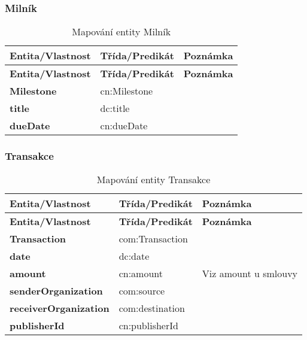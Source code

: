 \subsubsection*{Milník}

\begin{center}
\begin{longtable}{lp{30mm}p{65mm}}
\label{grid_mlmmh} \\
\multicolumn{1}{l}{\textbf{Entita/Vlastnost}} & 
\multicolumn{1}{l}{\textbf{Třída/Predikát}} & 
\multicolumn{1}{l}{\textbf{Poznámka}} \\ \hline 
\endfirsthead
\multicolumn{1}{l}{\textbf{Entita/Vlastnost}} & 
\multicolumn{1}{l}{\textbf{Třída/Predikát}} & 
\multicolumn{1}{l}{\textbf{Poznámka}} \\ \hline 
\hline
\endhead
\endfoot
\caption{Mapování entity Milník}
\endlastfoot
\textbf{Milestone} & cn:Milestone \\
\textbf{title} & dc:title \\
\textbf{dueDate} & cn:dueDate \\
\end{longtable}
\end{center}

\newpage

\subsubsection*{Transakce}

\begin{center}
\begin{longtable}{lp{30mm}p{65mm}}
\label{grid_mlmmh} \\
\multicolumn{1}{l}{\textbf{Entita/Vlastnost}} & 
\multicolumn{1}{l}{\textbf{Třída/Predikát}} & 
\multicolumn{1}{l}{\textbf{Poznámka}} \\ \hline 
\endfirsthead
\multicolumn{1}{l}{\textbf{Entita/Vlastnost}} & 
\multicolumn{1}{l}{\textbf{Třída/Predikát}} & 
\multicolumn{1}{l}{\textbf{Poznámka}} \\ \hline 
\hline
\endhead
\endfoot
\caption{Mapování entity Transakce}
\endlastfoot
\textbf{Transaction} & com:Transaction \\
\textbf{date} & dc:date \\
\textbf{amount} & cn:amount & Viz amount u smlouvy\\
\textbf{senderOrganization} & com:source \\
\textbf{receiverOrganization} & com:destination \\ 
\textbf{publisherId} & cn:publisherId \\
\end{longtable}
\end{center}

